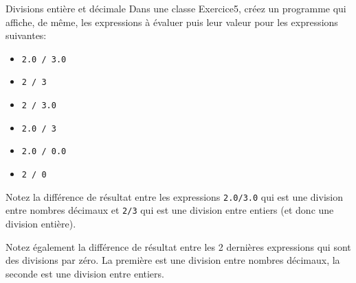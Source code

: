 \documentclass[a4paper,11pt]{style-esi/td}
\begin{document}
\begin{Exercice}{Divisions entière et décimale}
	Dans une classe Exercice5, créez un programme qui affiche, de même, les
	expressions à évaluer puis leur valeur pour les expressions suivantes:

	\begin{itemize}
		\item \texttt{2.0 / 3.0}
		\item \texttt{2 / 3}
		\item \texttt{2 / 3.0}
		\item \texttt{2.0 / 3}
		\item \texttt{2.0 / 0.0}
		\item \texttt{2 / 0}
	\end{itemize}

	Notez la différence de résultat entre les expressions \texttt{2.0/3.0} qui est une division entre nombres décimaux
	et \texttt{2/3} qui est une division entre entiers (et donc une division entière).

	Notez également la différence de résultat entre les 2 dernières expressions qui sont des divisions par zéro.
	La première est une division entre nombres décimaux,
	la seconde est une division entre entiers.
\end{Exercice}
%
\end{document}
